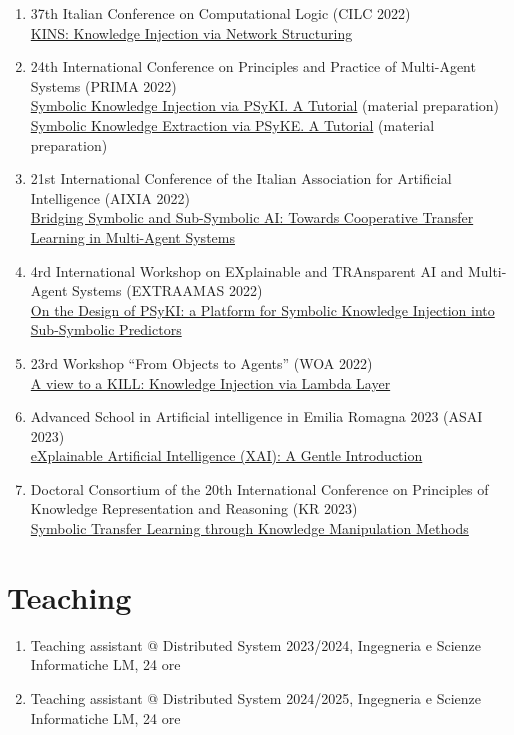 \documentclass[11pt]{article}
\begin{document}
\begin{enumerate}
	\item 37th Italian Conference on Computational Logic (CILC 2022)
	\\\href{https://apice.unibo.it/xwiki/bin/view/Talk/KinsCilc2022}{KINS: Knowledge Injection via Network Structuring}
	\item 24th International Conference on Principles and Practice of Multi-Agent Systems (PRIMA 2022)
	\\\href{https://apice.unibo.it/xwiki/bin/view/Talk/PsykitutorialPrima2022}{Symbolic Knowledge Injection via PSyKI. A Tutorial} (material preparation)
	\\\href{https://apice.unibo.it/xwiki/bin/view/Talk/PsykiPrima2022}{Symbolic Knowledge Extraction via PSyKE. A Tutorial} (material preparation)
	\item 21st International Conference of the Italian Association for Artificial Intelligence (AIXIA 2022)
	\\\href{https://apice.unibo.it/xwiki/bin/view/Talk/CtlAixia2022}{Bridging Symbolic and Sub-Symbolic AI: Towards Cooperative Transfer Learning in Multi-Agent Systems}
	\item 4rd International Workshop on EXplainable and TRAnsparent AI and Multi-Agent Systems (EXTRAAMAS 2022)
	\\\href{https://apice.unibo.it/xwiki/bin/view/Talk/PsykiExtraamas2022}{On the Design of PSyKI: a Platform for Symbolic Knowledge Injection into Sub-Symbolic Predictors}
	\item 23rd Workshop ``From Objects to Agents'' (WOA 2022)
	\\\href{https://apice.unibo.it/xwiki/bin/view/Talk/KillWoa2022}{A view to a KILL: Knowledge Injection via Lambda Layer}
	\item Advanced School in Artificial intelligence in Emilia Romagna 2023 (ASAI 2023)
	\\\href{https://apice.unibo.it/xwiki/bin/view/Talk/XaiAsaiErBertinoro2023}{eXplainable Artificial Intelligence (XAI): A Gentle Introduction}
	\item Doctoral Consortium of the 20th International Conference on Principles of Knowledge Representation and Reasoning (KR 2023)
	\\\href{https://apice.unibo.it/xwiki/bin/view/Talk/SymbolicTransferLearning}{Symbolic Transfer Learning through Knowledge Manipulation Methods}
\end{enumerate}


\section{Teaching}\label{sec:teaching}
\begin{enumerate}
	\item Teaching assistant @ Distributed System 2023/2024, Ingegneria e Scienze Informatiche LM, 24 ore
	\item Teaching assistant @ Distributed System 2024/2025, Ingegneria e Scienze Informatiche LM, 24 ore
\end{enumerate}
\end{document}
